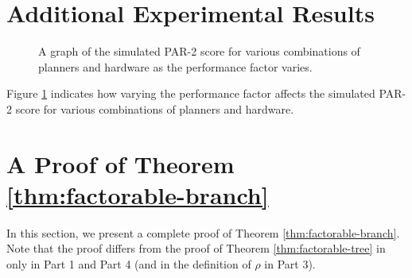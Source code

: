 \section{Additional Experimental Results}

\begin{figure}[t]
\begin{center}

\caption{\label{fig:performance-factor} A graph of the simulated PAR-2 score for various combinations of planners and hardware as the performance factor varies.}
\end{center}
\end{figure}

Figure \ref{fig:performance-factor} indicates how varying the performance factor affects the simulated PAR-2 score for various combinations of planners and hardware. 

\section{A Proof of Theorem \ref{thm:factorable-branch}}
\label{sec:appendix:proof}

In this section, we present a complete proof of Theorem \ref{thm:factorable-branch}. Note that the proof differs from the proof of Theorem \ref{thm:factorable-tree} in \cite{DDV19} only in Part 1 and Part 4 (and in the definition of $\rho$ in Part 3).

